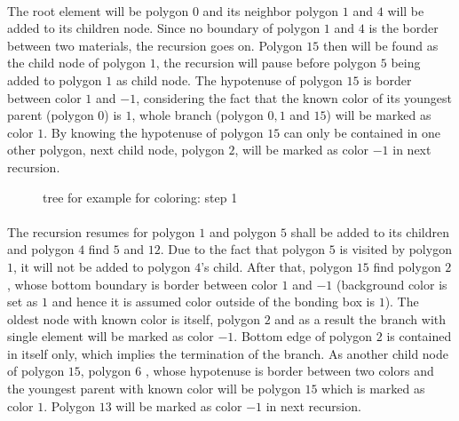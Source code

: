 \paragraph{}
The root element will be polygon $0$ and its neighbor polygon $1$ and $4$ will be added to its children node.
Since no boundary of polygon $1$ and $4$ is the border between two materials, the recursion goes on.
Polygon $15$ then will be found as the child node of polygon $1$, the recursion will pause before polygon $5$ being added to polygon $1$ as child node.
The hypotenuse of polygon $15$ is border between color $1$ and $-1$, considering the fact that the known color of its youngest parent (polygon $0$) is $1$, whole branch (polygon $0,1$ and $15$) will be marked as color $1$.
By knowing the hypotenuse of polygon $15$ can only be contained in one other polygon, next child node, polygon $2$, will be marked as color $-1$ in next recursion.
    \begin{figure}[!ht]
        \centering
        \caption[Tree for example for coloring: step 1]{tree for example for coloring: step 1}
        \label{qdt_fig:qdt_color_tree_0}
    \end{figure}

\paragraph{}
The recursion resumes for polygon $1$ and polygon $5$ shall be added to its children and polygon $4$ find $5$ and $12$.
Due to the fact that polygon $5$ is visited by polygon $1$, it will not be added to polygon $4$'s child.
After that, polygon $15$ find polygon $2$, whose bottom boundary is border between color $1$ and $-1$ (background color is set as $1$ and hence it is assumed color outside of the bonding box is $1$).
The oldest node with known color is itself, polygon $2$ and as a result the branch with single element will be marked as color $-1$.
Bottom edge of polygon $2$ is contained in itself only, which implies the termination of the branch.
As another child node of polygon $15$, polygon $6$ , whose hypotenuse is border between two colors and the youngest parent with known color will be polygon $15$ which is marked as color $1$.
Polygon $13$ will be marked as color $-1$ in next recursion.

